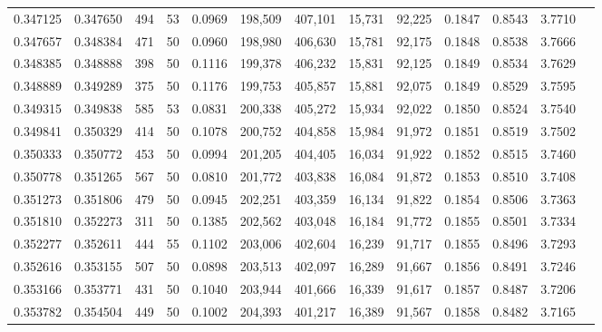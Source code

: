 \begin{tabular}{rrrrrrrrrrrrr}
0.347125 & 0.347650 &   494 &  53 &                                     0.0969 & 198,509 & 407,101 &  15,731 &  92,225 & 0.1847 & 0.8543 & 3.7710 \\
0.347657 & 0.348384 &   471 &  50 &                                     0.0960 & 198,980 & 406,630 &  15,781 &  92,175 & 0.1848 & 0.8538 & 3.7666 \\
0.348385 & 0.348888 &   398 &  50 &                                     0.1116 & 199,378 & 406,232 &  15,831 &  92,125 & 0.1849 & 0.8534 & 3.7629 \\
0.348889 & 0.349289 &   375 &  50 &                                     0.1176 & 199,753 & 405,857 &  15,881 &  92,075 & 0.1849 & 0.8529 & 3.7595 \\
0.349315 & 0.349838 &   585 &  53 &                                     0.0831 & 200,338 & 405,272 &  15,934 &  92,022 & 0.1850 & 0.8524 & 3.7540 \\
0.349841 & 0.350329 &   414 &  50 &                                     0.1078 & 200,752 & 404,858 &  15,984 &  91,972 & 0.1851 & 0.8519 & 3.7502 \\
0.350333 & 0.350772 &   453 &  50 &                                     0.0994 & 201,205 & 404,405 &  16,034 &  91,922 & 0.1852 & 0.8515 & 3.7460 \\
0.350778 & 0.351265 &   567 &  50 &                                     0.0810 & 201,772 & 403,838 &  16,084 &  91,872 & 0.1853 & 0.8510 & 3.7408 \\
0.351273 & 0.351806 &   479 &  50 &                                     0.0945 & 202,251 & 403,359 &  16,134 &  91,822 & 0.1854 & 0.8506 & 3.7363 \\
0.351810 & 0.352273 &   311 &  50 &                                     0.1385 & 202,562 & 403,048 &  16,184 &  91,772 & 0.1855 & 0.8501 & 3.7334 \\
0.352277 & 0.352611 &   444 &  55 &                                     0.1102 & 203,006 & 402,604 &  16,239 &  91,717 & 0.1855 & 0.8496 & 3.7293 \\
0.352616 & 0.353155 &   507 &  50 &                                     0.0898 & 203,513 & 402,097 &  16,289 &  91,667 & 0.1856 & 0.8491 & 3.7246 \\
0.353166 & 0.353771 &   431 &  50 &                                     0.1040 & 203,944 & 401,666 &  16,339 &  91,617 & 0.1857 & 0.8487 & 3.7206 \\
0.353782 & 0.354504 &   449 &  50 &                                     0.1002 & 204,393 & 401,217 &  16,389 &  91,567 & 0.1858 & 0.8482 & 3.7165 \\

\end{tabular}
